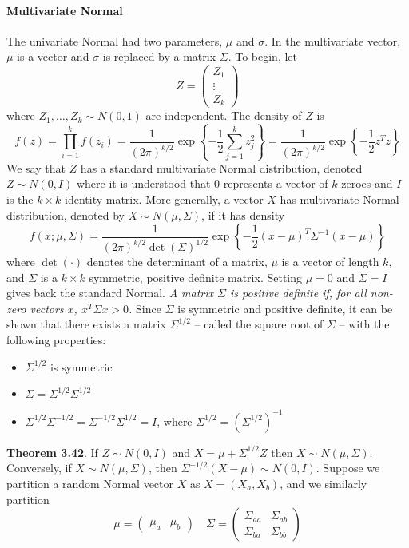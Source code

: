 \paragraph{Multivariate Normal}\label{rv:multivariate:normal}
The univariate Normal had two parameters, \(\mu\) and \(\sigma\). In the
multivariate vector, \(\mu\) is a vector and \(\sigma\) is replaced by a
matrix \(\Sigma\). To begin, let
\[
Z = \begin{pmatrix}
Z_{1} \\
\vdots \\
Z_{k}
\end{pmatrix}
\]
where \(Z_{1}, \dots, Z_{k} \sim N(0, 1)\) are independent. The density of
\(Z\) is
\[
f(z) = \prod_{i=1}^{k} f(z_{i}) 
= \frac{1}{(2 \pi)^{k/2}} \exp \left\{ -\frac{1}{2} \sum_{j=1}^{k} z_{j}^{2} \right\} 
= \frac{1}{(2 \pi)^{k/2}} \exp \left\{ -\frac{1}{2} z^T z \right\} 
\]
We say that \(Z\) has a standard multivariate Normal distribution, denoted \(Z \sim N(0, I)\) where it is understood that \(0\) represents a vector of \(k\) zeroes and \(I\) is the \(k \times k\) identity matrix.
More generally, a vector \(X\) has multivariate Normal distribution, denoted by \(X \sim N(\mu, \Sigma)\), if it has density
\[
f(x; \mu, \Sigma) = \frac{1}{(2 \pi)^{k/2} \det(\Sigma)^{1/2}} \exp \left\{ - \frac{1}{2} (x - \mu)^T \Sigma^{-1} (x - \mu) \right\}
\]
where \(\det(\cdot)\) denotes the determinant of a matrix, \(\mu\) is a vector of length \(k\), and \(\Sigma\) is a \(k \times k\) symmetric, positive definite matrix. Setting \(\mu = 0\) and \(\Sigma = I\) gives back the standard Normal.
\emph{A matrix \(\Sigma\) is positive definite if, for all non-zero vectors \(x\), \(x^T \Sigma x > 0\).}
Since \(\Sigma\) is symmetric and positive definite, it can be shown that there exists a matrix \(\Sigma^{1/2}\) -- called the square root of \(\Sigma\) -- with the following properties:
\begin{itemize}[tightlist]
\item
  \(\Sigma^{1/2}\) is symmetric
\item
  \(\Sigma = \Sigma^{1/2} \Sigma^{1/2}\)
\item
  \(\Sigma^{1/2}\Sigma^{-1/2} = \Sigma^{-1/2}\Sigma^{1/2} = I\), where
  \(\Sigma^{1/2} = \left(\Sigma^{1/2}\right)^{-1}\)
\end{itemize}

\textbf{Theorem 3.42}. If \(Z \sim N(0, I)\) and
\(X = \mu + \Sigma^{1/2} Z\) then \(X \sim N(\mu, \Sigma)\). Conversely,
if \(X \sim N(\mu, \Sigma)\), then
\(\Sigma^{-1/2}(X - \mu) \sim N(0, I)\).
Suppose we partition a random Normal vector \(X\) as \(X = (X_a, X_b)\),
and we similarly partition
\[
\mu = \begin{pmatrix}\mu_a & \mu_b \end{pmatrix} 
\quad
\Sigma = \begin{pmatrix}
\Sigma_{aa} & \Sigma_{ab} \\
\Sigma_{ba} & \Sigma_{bb}
\end{pmatrix}
\]

